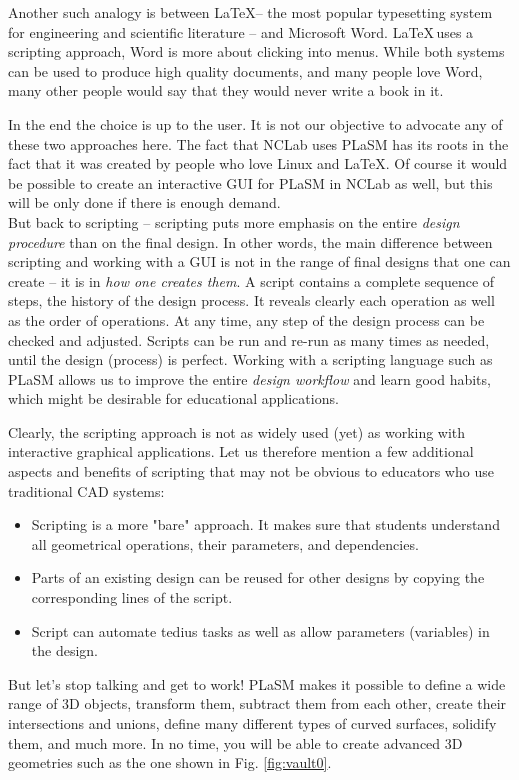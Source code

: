 \documentclass{article}
\begin{document}
Another such analogy is between \LaTeX -- the most popular typesetting system for engineering 
and scientific literature -- and Microsoft Word. \LaTeX \,uses a scripting approach, Word is more
about clicking into menus. While both systems can be used to produce high quality documents, 
and many people love Word, many other people would say that they would never write a book in it. 

In the end the choice is up to the user. It is not our objective to advocate any
of these two approaches here. The fact that NCLab uses PLaSM has its roots in
the fact that it was created by people who love Linux and \LaTeX. Of course it would be possible 
to create an interactive GUI for PLaSM in NCLab as well, but this will be only done if there 
is enough demand.\\

\noindent
But back to scripting -- scripting puts more emphasis on the entire {\em design procedure}
than on the final design. In other words, the main difference between 
scripting and working with a GUI is not in the range of final designs that one can create 
-- it is in {\em how one creates them}. A script contains 
a complete sequence of steps, the history of the design process. It reveals clearly each 
operation as well as the order of operations. At any time, any step 
of the design process can be checked and adjusted. Scripts can be run and 
re-run as many times as needed, until the design (process) is perfect. 
Working with a scripting language such as PLaSM allows us to improve the entire  
{\em design workflow} and learn good habits, which might be desirable for
educational applications.

Clearly, the scripting approach is not as widely used (yet) as working with 
interactive graphical applications. Let us therefore mention a few 
additional aspects and benefits of scripting that may not be obvious 
to educators who use traditional CAD systems:


\begin{itemize}

\item Scripting is a more "bare" approach. It makes sure that students understand
      all geometrical operations, their parameters, and dependencies.
\item Parts of an existing design can be reused for other designs by copying the 
      corresponding lines of the script. 
\item Script can automate tedius tasks as well as allow parameters (variables)
      in the design. 
\end{itemize}
But let's stop talking and get to work! PLaSM makes it possible to define a wide range of 3D 
objects, transform them, subtract them from each other, create their intersections
and unions, define many different types of curved surfaces, solidify them, and 
much more. In no time, you will be able to create advanced 3D geometries such 
as the one shown in Fig. \ref{fig:vault0}.
\end{document}
